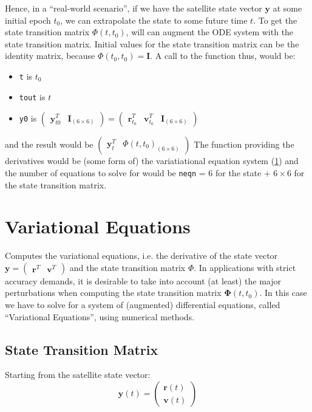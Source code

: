 Hence, in a ``real-world scenario'', if we have the satellite state vector 
$\bm{y}$ at some initial epoch $t_0$, we can extrapolate the state to some 
future time $t$. To get the state transition matrix $\Phi (t,t_0)$, will can 
augment the ODE system with the state transition matrix. Initial values for 
the state transition matrix can be the identity matrix, because 
$\Phi (t_0,t_0) = \bm{I}$. A call to the function thus, would be:
\begin{itemize}
    \item \texttt{t} is $t_0$
    \item \texttt{tout} is $t$
    \item \texttt{y0} is 
    $\begin{pmatrix} \bm{y}^T_{t0} & \bm{I}_{(6 \times 6)} \end{pmatrix} = 
    \begin{pmatrix} \bm{r}^T_{t_0} & \bm{v}^T_{t_0} & \bm{I}_{(6 \times 6)} \end{pmatrix}$
\end{itemize}
and the result would be 
$\begin{pmatrix} \bm{y}^T_{t} & \Phi(t,t_0)_{(6 \times 6)} \end{pmatrix}$
The function providing the derivatives would be (some form of) the 
variatiational equation system (\ref{sec:variational-equations}) and the number 
of equations to solve for would be \texttt{neqn} = $6$ for the state + $6 \times 6$ for 
the state transition matrix.


\section{Variational Equations}
\label{sec:variational-equations}

Computes the variational equations, i.e. the derivative of the state vector 
$\bm{y} = \begin{pmatrix}\bm{r}^T & \bm{v}^T \end{pmatrix}$ and the state 
transition matrix $\Phi$. In applications with strict accuracy demands, it is 
desirable to take into account (at least) the major perturbations when computing 
the state transition matrix $\bm{\Phi}(t,t_0)$. In this case we have to solve 
for a system of (augmented) differential equations, called ``Variational Equations'', 
using numerical methods.

\subsection{State Transition Matrix}
\label{ssec:ode-state-transition-matrix}
Starting from the satellite state vector:
\begin{equation}
  \bm{y}(t) = \begin{pmatrix} \bm{r}(t) \\ \bm{v}(t) \end{pmatrix}
\end{equation}

